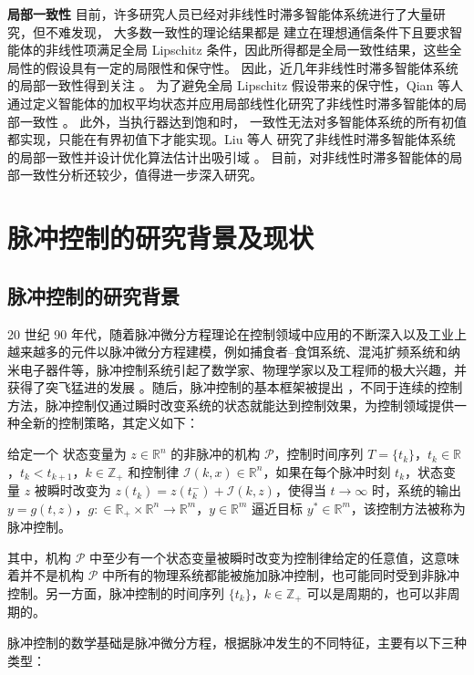 \textbf{局部一致性}
目前，许多研究人员已经对非线性时滞多智能体系统进行了大量研究，但不难发现， 大多数一致性的理论结果都是 建立在理想通信条件下且要求智能体的非线性项满足全局 Lipschitz 条件，因此所得都是全局一致性结果，这些全局性的假设具有一定的局限性和保守性。 因此，近几年非线性时滞多智能体系统的局部一致性得到关注 \cite{qian2017local2462,2019dynamic1699}。
为了避免全局 Lipschitz 假设带来的保守性，Qian 等人通过定义智能体的加权平均状态并应用局部线性化研究了非线性时滞多智能体的局部一致性 \cite{qian2017local2462}。
此外，当执行器达到饱和时， 一致性无法对多智能体系统的所有初值都实现，只能在有界初值下才能实现。Liu 等人
 研究了非线性时滞多智能体系统的局部一致性并设计优化算法估计出吸引域 \cite{2019dynamic1699}。
目前，对非线性时滞多智能体的局部一致性分析还较少，值得进一步深入研究。
\section{脉冲控制的研究背景及现状}\setcounter{equation}{0}
\subsection{脉冲控制的研究背景}
20 世纪 90 年代，随着脉冲微分方程理论在控制领域中应用的不断深入以及工业上越来越多的元件以脉冲微分方程建模，例如捕食者--食饵系统、混沌扩频系统和纳米电子器件等，脉冲控制系统引起了数学家、物理学家以及工程师的极大兴趣，并获得了突飞猛进的发展 \cite{lakshmikantham1989theory}。随后，脉冲控制的基本框架被提出 \cite{yang2001impulsive}，不同于连续的控制方法，脉冲控制仅通过瞬时改变系统的状态就能达到控制效果，为控制领域提供一种全新的控制策略，其定义如下：
\begin{definition} \cite{yang2001impulsive}
 给定一个 状态变量为 $z\in\mathbb{R}^n$ 的非脉冲的机构 $\mathcal{P}$，控制时间序列 $T=\{t_k\}$，$t_k\in\mathbb{R}$，$t_k<t_{k+1}$，$k\in\mathbb{Z}_+ $ 和控制律 $\mathcal{I} (k,x)\in\mathbb{R}^n$，如果在每个脉冲时刻 $t_k$，状态变量 $z$ 被瞬时改变为 $z(t_k)=z(t^-_k)+ \mathcal{I} (k,z)$，使得当 $t\rightarrow \infty$ 时，系统的输出 $y=g(t,z)$，$g: \in\mathbb{R}_+\times \mathbb{R}^n\rightarrow \mathbb{R}^m$，$ y\in\mathbb{R}^m$ 逼近目标 $y^*\in\mathbb{R}^m$，该控制方法被称为脉冲控制。
\end{definition} 
其中，机构 $\mathcal{P}$ 中至少有一个状态变量被瞬时改变为控制律给定的任意值，这意味着并不是机构 $\mathcal{P}$ 中所有的物理系统都能被施加脉冲控制，也可能同时受到非脉冲控制。另一方面，脉冲控制的时间序列 $\{t_k\}$，$k\in\mathbb{Z}_+$ 可以是周期的，也可以非周期的。

脉冲控制的数学基础是脉冲微分方程，根据脉冲发生的不同特征，主要有以下三种类型：


